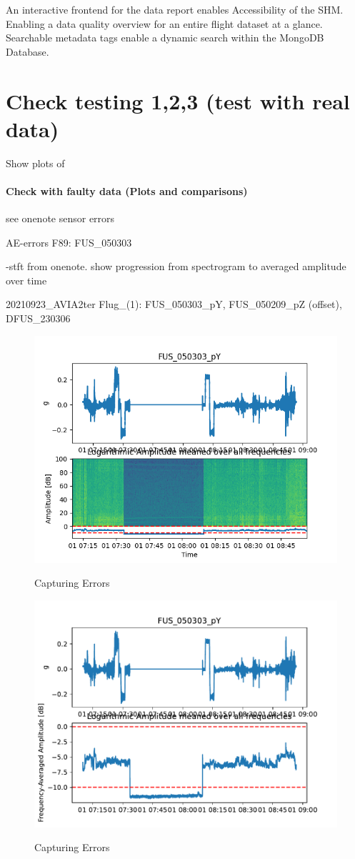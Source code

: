 An interactive frontend for the data report enables Accessibility of the SHM. Enabling a data quality overview for an entire flight dataset at a glance. Searchable metadata tags enable a dynamic search within the MongoDB Database.



\section{Check testing 1,2,3 (test with real data)}

Show plots of
\paragraph{Check with faulty data (Plots and comparisons)}
see onenote sensor errors

AE-errors
F89: FUS_050303

-stft from onenote. show progression from spectrogram to averaged amplitude over time


20210923_AVIA2ter Flug_(1): FUS_050303_pY, FUS_050209_pZ (offset), DFUS_230306

\begin{figure}
    \centering
    \includegraphics[width=.7\textwidth]{03_figures/python_functions/images/FUS_050303_spectro.png}
    \label{fig:res_050303_spectrogram}
    \caption{Capturing Errors}
\end{figure}



\begin{figure}
    \centering
    \includegraphics[width=.7\textwidth]{03_figures/python_functions/images/FUS_050303}
    \label{fig:res_050303}
    \caption{Capturing Errors}
\end{figure}

